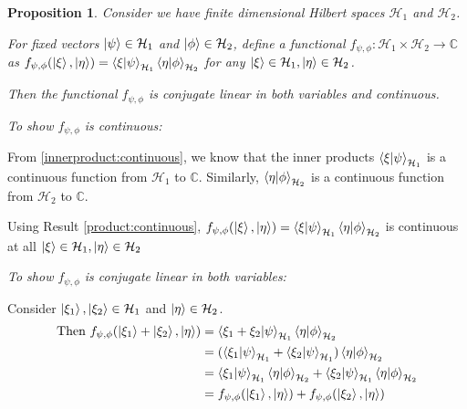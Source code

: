 \documentclass[12pt,twoside,fleqn]{report}
\makeatletter
\theoremstyle{thmstyle}
\renewenvironment{proof}[1][\proofname]{\par
\pushQED{\qed}%
\normalfont \topsep6\p@\@plus6\p@\relax
\trivlist
\item[\hskip\labelsep\itshape#1\@addpunct{.}]\mbox{}\par\nobreak\ignorespaces
}{%
    \popQED\endtrivlist\@endpefalse
    }
\newtheorem{prop}{Proposition}[chapter]
\makeatother
\begin{document}
\begin{prop}
    Consider we have finite dimensional Hilbert spaces $\mathcal{H}_1$ and $\mathcal{H}_2$. 

    For fixed vectors $\ket{\psi} \in \mathcal{H}_1$ and $\ket{\phi} \in \mathcal{H}_2$, define a functional $f_{\psi,\phi}: \mathcal{H}_1 \times \mathcal{H}_2 \to \mathbb{C}$ as $f_{\psi,\phi}(\ket\xi, \ket\eta) = \braket{\xi|\psi}_{\mathcal{H}_1} \braket{\eta | \phi}_{\mathcal{H}_2}$ for any $\ket{\xi} \in \mathcal{H}_1, \ket{\eta} \in \mathcal{H}_2$.

    Then the functional $f_{\psi,\phi}$ is conjugate linear in both variables and continuous.
\end{prop}
\begin{proof}
    \emph{To show $f_{\psi, \phi}$ is continuous:}

    From \ref{innerproduct:continuous}, we know that the inner products $\braket{\xi|\psi}_{\mathcal{H}_1}$ is a continuous function from $\mathcal{H}_1$ to $\mathbb{C}$. 
    Similarly, $\braket{\eta|\phi}_{\mathcal{H}_2}$ is a continuous function from $\mathcal{H}_2$ to $\mathbb{C}$.


    Using Result \ref{product:continuous}, $f_{\psi, \phi}(\ket\xi, \ket\eta) = \braket{\xi | \psi}_{\mathcal{H}_1} \braket{\eta|\phi}_{\mathcal{H}_2}$ is continuous at all $\ket\xi \in \mathcal{H}_1, \ket{\eta} \in \mathcal{H}_2$
    
    \emph{To show $f_{\psi, \phi}$ is conjugate linear in both variables:}
    
    Consider $\ket{\xi_1}, \ket{\xi_2} \in \mathcal{H}_1$ and $\ket{\eta} \in \mathcal{H}_2$. 
    \begin{align*}
        \text{Then }f_{\psi,\phi}(\ket{\xi_1} + \ket{\xi_2}, \ket{\eta}) & = \braket{\xi_1 + \xi_2 | \psi}_{\mathcal{H}_1} \braket{\eta | \phi}_{\mathcal{H}_2} 
        \\ & = (\braket{\xi_1 | \psi}_{\mathcal{H}_1}+ \braket{\xi_2 | \psi}_{\mathcal{H}_1}) \braket{\eta|\phi}_{\mathcal{H}_2}
        \\ & = \braket{\xi_1| \psi}_{\mathcal{H}_1}\braket{\eta|\phi}_{\mathcal{H}_2} + \braket{\xi_2|\psi}_{\mathcal{H}_1}\braket{\eta|\phi}_{\mathcal{H}_2}
        \\ & = f_{\psi,\phi}(\ket{\xi_1}, \ket{\eta}) + f_{\psi,\phi}(\ket{\xi_2},\ket{\eta})
    \end{align*}


\end{proof}
\end{document}
